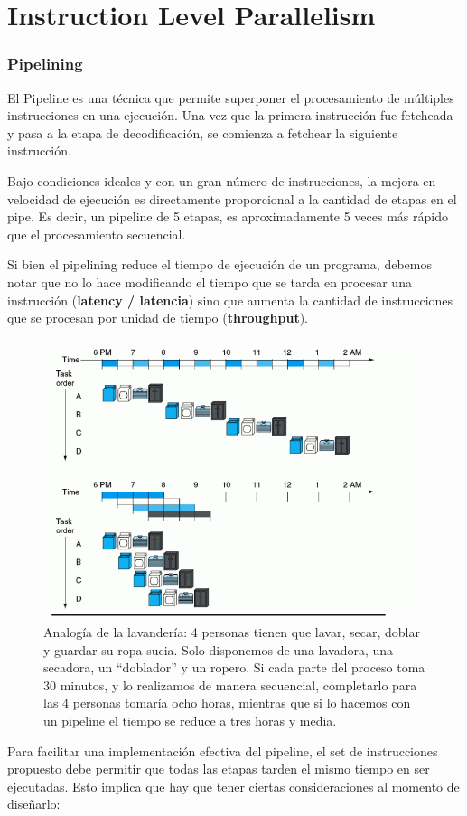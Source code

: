 \part{Instruction Level Parallelism}
\section{Pipelining}
El Pipeline es una técnica que permite superponer el procesamiento de múltiples instrucciones en una ejecución. Una vez que la primera instrucción fue fetcheada y pasa a la etapa de decodificación, se comienza a fetchear la siguiente instrucción. 

Bajo condiciones ideales y con un gran número de instrucciones, la mejora en velocidad de ejecución es directamente proporcional a la cantidad de etapas en el pipe. Es decir, un pipeline de 5 etapas, es aproximadamente 5 veces más rápido que el procesamiento secuencial.  

Si bien el pipelining reduce el tiempo de ejecución de un programa, debemos notar que no lo hace modificando el tiempo que se tarda en procesar una instrucción (\textbf{latency / latencia}) sino que aumenta la cantidad de instrucciones que se procesan por unidad de tiempo (\textbf{throughput}).
\begin{figure}[h]
	\centering
	\includegraphics[width=0.5\linewidth]{imagenes/pipelining}
	\caption{Analogía de la lavandería: 4 personas tienen que lavar, secar, doblar y guardar su ropa sucia. Solo disponemos de una lavadora, una secadora, un ``doblador'' y un ropero. Si cada parte del proceso toma 30 minutos, y lo realizamos de manera secuencial, completarlo para las 4 personas tomaría ocho horas, mientras que si lo hacemos con un pipeline el tiempo se reduce a tres horas y media.}
	\label{fig:pipelining}
\end{figure}

Para facilitar una implementación efectiva del pipeline, el set de instrucciones propuesto debe permitir que todas las etapas tarden el mismo tiempo en ser ejecutadas. Esto implica que hay que tener ciertas consideraciones al momento de diseñarlo:

